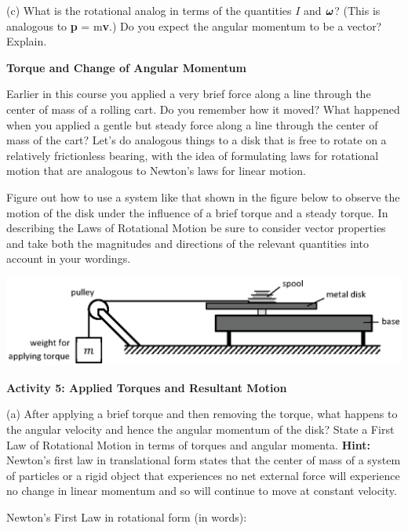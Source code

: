 (c) What is the rotational analog in terms of the quantities $I$ and \( 
\mbox{\boldmath$\omega$}  \)? (This is analogous to \textbf{p} = m\textbf{v}.)
Do you expect the angular momentum to be a vector? Explain.
\answerspace{30mm}

\textbf{Torque and Change of Angular Momentum }

Earlier in this course you applied a very brief force along a line through the
center of mass of a rolling cart. Do you remember how it moved? What happened
when you applied a gentle but steady force along a line through the center of
mass of the cart? Let's do analogous things to a disk that is free to rotate
on a relatively frictionless bearing, with the idea of formulating laws for
rotational motion that are analogous to Newton's laws for linear motion. 

Figure out how to use a system like that shown in the figure below to observe
the motion of the disk under the influence of a brief torque and a steady torque.
In describing the Laws of Rotational Motion be sure to consider vector properties
and take both the magnitudes and directions of the relevant quantities into
account in your wordings. 

\vspace{0.3cm}
{\par\centering \includegraphics{ang_mom/ang_mom_fig6_new.eps} \par}
\vspace{0.3cm}

\textbf{Activity 5: Applied Torques and Resultant Motion }

(a) After applying a brief torque and then removing the torque, what happens to the angular velocity and hence the angular momentum of the
disk? State a First Law of Rotational Motion in terms of torques and angular momenta. \textbf{Hint:} Newton's first law in translational form states that the center of mass of a system of particles or a rigid object that experiences no net external force will experience no change in linear momentum and so will continue to move at constant velocity.

Newton's First Law in rotational form (in words):
\vspace{20mm}

